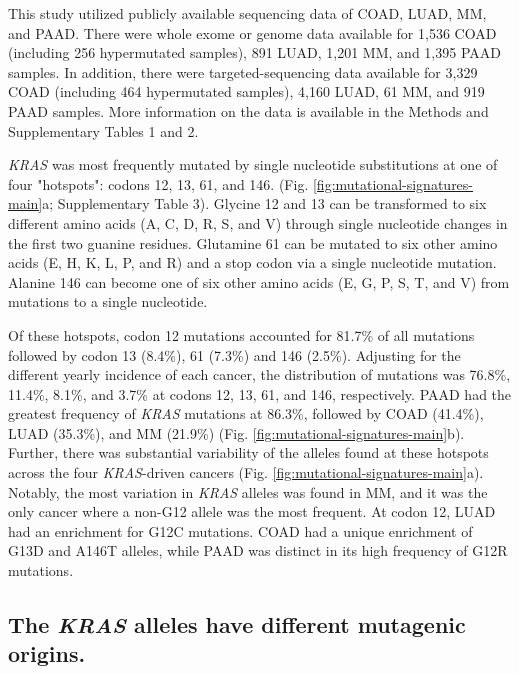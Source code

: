 \documentclass[english, 10pt, letterpaper]{article}
\newcommand{\KRAS}{\emph{KRAS}}
\begin{document}
This study utilized publicly available sequencing data of COAD, LUAD, MM, and PAAD.
There were whole exome or genome data available for 1,536 COAD (including 256 hypermutated samples), 891 LUAD, 1,201 MM, and 1,395 PAAD samples.
In addition, there were targeted-sequencing data available for 3,329 COAD (including 464 hypermutated samples), 4,160 LUAD, 61 MM, and 919 PAAD samples.
More information on the data is available in the Methods and Supplementary Tables 1 and 2.

\KRAS{} was most frequently mutated by single nucleotide substitutions at one of four "hotspots": codons 12, 13, 61, and 146. (Fig. \ref{fig:mutational-signatures-main}a; Supplementary Table 3).
Glycine 12 and 13 can be transformed to six different amino acids (A, C, D, R, S, and V) through single nucleotide changes in the first two guanine residues.
Glutamine 61 can be mutated to six other amino acids (E, H, K, L, P, and R) and a stop codon via a single nucleotide mutation.
Alanine 146 can become one of six other amino acids (E, G, P, S, T, and V) from mutations to a single nucleotide.

Of these hotspots, codon 12 mutations accounted for 81.7\% of all mutations followed by codon 13 (8.4\%), 61 (7.3\%) and 146 (2.5\%).
Adjusting for the different yearly incidence of each cancer, the distribution of mutations was 76.8\%, 11.4\%, 8.1\%, and 3.7\% at codons 12, 13, 61, and 146, respectively.
PAAD had the greatest frequency of \KRAS{} mutations at 86.3\%, followed by COAD (41.4\%), LUAD (35.3\%), and MM (21.9\%) (Fig. \ref{fig:mutational-signatures-main}b).
Further, there was substantial variability of the alleles found at these hotspots across the four \KRAS{}-driven cancers (Fig. \ref{fig:mutational-signatures-main}a). 
Notably, the most variation in \KRAS{} alleles was found in MM, and it was the only cancer where a non-G12 allele was the most frequent.
At codon 12, LUAD had an enrichment for G12C mutations.
COAD had a unique enrichment of G13D and A146T alleles, while PAAD was distinct in its high frequency of G12R mutations.


\subsection*{The \KRAS{} alleles have different mutagenic origins.}
\end{document}
